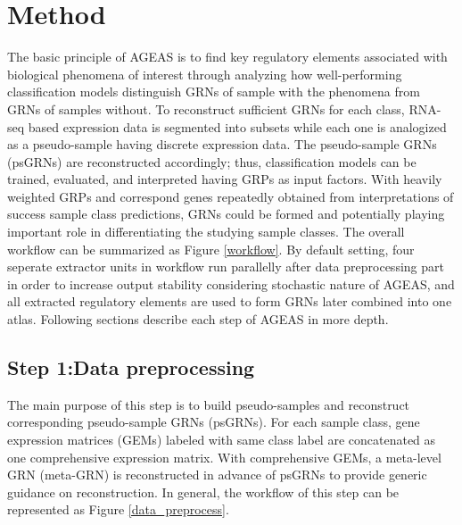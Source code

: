 \documentclass[fleqn,10pt]{wlscirep}
\begin{document}
\section*{Method}
  \label{method}
  The basic principle of AGEAS is to find key regulatory elements associated with biological phenomena of interest through analyzing how well-performing classification models distinguish GRNs of sample with the phenomena from GRNs of samples without.
  To reconstruct sufficient GRNs for each class, RNA-seq based expression data is segmented into subsets while each one is analogized as a pseudo-sample having discrete expression data.
  The pseudo-sample GRNs (psGRNs) are reconstructed accordingly; thus, classification models can be trained, evaluated, and interpreted having GRPs as input factors.
  With heavily weighted GRPs and correspond genes repeatedly obtained from interpretations of success sample class predictions, GRNs could be formed and potentially playing important role in differentiating the studying sample classes.
  The overall workflow can be summarized as Figure \ref{workflow}.
  By default setting, four seperate extractor units in workflow run parallelly after data preprocessing part in order to increase output stability considering stochastic nature of AGEAS, and all extracted regulatory elements are used to form GRNs later combined into one atlas.
  Following sections describe each step of AGEAS in more depth.


  \subsection*{Step 1:Data preprocessing}
    \label{step1}
    The main purpose of this step is to build pseudo-samples and reconstruct corresponding pseudo-sample GRNs (psGRNs).
    For each sample class, gene expression matrices (GEMs) labeled with same class label are concatenated as one comprehensive expression matrix.
    With comprehensive GEMs, a meta-level GRN (meta-GRN) is reconstructed in advance of psGRNs to provide generic guidance on reconstruction.
    In general, the workflow of this step can be represented as Figure \ref{data_preprocess}.
\end{document}
